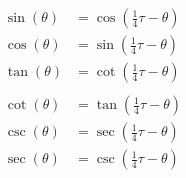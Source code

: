 \begin{equation}
\begin{split}
    \sin(\theta) &= \cos(\frac{1}{4}\tau - \theta) \\
    \cos(\theta) &= \sin(\frac{1}{4}\tau - \theta) \\
    \tan(\theta) &= \cot(\frac{1}{4}\tau - \theta) \\
    &\\
    \cot(\theta) &= \tan(\frac{1}{4}\tau - \theta) \\
    \csc(\theta) &= \sec(\frac{1}{4}\tau - \theta) \\
    \sec(\theta) &= \csc(\frac{1}{4}\tau - \theta)
\end{split}
\end{equation}